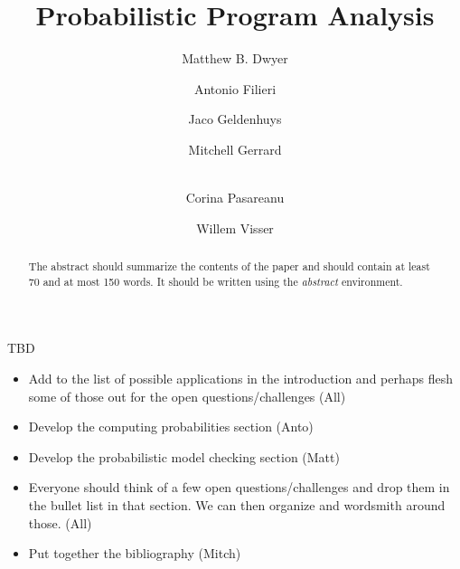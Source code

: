 \documentclass[runningheads,a4paper]{llncs}
\begin{document}
\mainmatter  %

\newcommand{\mycomment}[1]{\textit{\textcolor{red}{#1}}}
\newcommand{\ignore}[1]{}

\title{Probabilistic Program Analysis}


\author{Matthew B. Dwyer
\and Antonio Filieri\and Jaco Geldenhuys\and Mitchell Gerrard\and\\
Corina Pasareanu\and Willem Visser}
%


%
%

\maketitle


\begin{abstract}
The abstract should summarize the contents of the paper and should
contain at least 70 and at most 150 words. It should be written using the
\emph{abstract} environment.
\keywords{}
\end{abstract}

TBD
\begin{itemize}
\item Add to the list of possible applications in the introduction
and perhaps flesh some of those out for the open questions/challenges (All)
\item Develop the computing probabilities section (Anto)
\item Develop the probabilistic model checking section (Matt)
\item Everyone should think of a few open questions/challenges and drop
them in the bullet list in that section.  We can then organize and wordsmith
around those. (All)
\item Put together the bibliography (Mitch)
\end{itemize}












\end{document}
